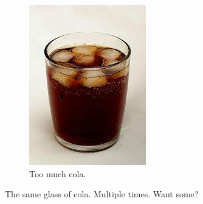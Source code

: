 \documentclass{article}
\begin{document}
\begin{figure}[h!]
\begin{subfigure}[b]{0.5\linewidth}
        	\includegraphics[width=\linewidth]{drink.jpg}
        	\caption{Too much cola.}
        \end{subfigure}
        \caption{The same glass of cola. Multiple times. Want some?}
        \label{fig:cola}
	\end{figure}
\end{document}
